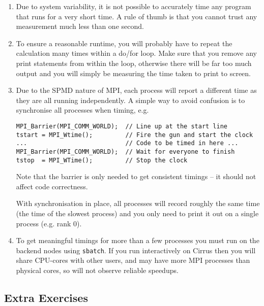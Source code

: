 \documentclass{article}
\begin{document}
\begin{enumerate}

\item Due to system variability, it is not possible to accurately time
  any program that runs for a very short time. A rule of thumb is
  that you cannot trust any measurement much less than one
  second.

\item To ensure a reasonable runtime, you will probably have to repeat
  the calculation many times within a do/for loop. Make sure that you
  remove any print statements from within the loop, otherwise there will
  be far too much output and you will simply be measuring the time taken
  to print to screen.

\item Due to the SPMD nature of MPI, each process will report
  a different time as they are all running independently. A simple way
  to avoid confusion is to synchronise all processes when timing, e.g.
\begin{verbatim}
MPI_Barrier(MPI_COMM_WORLD);  // Line up at the start line
tstart = MPI_Wtime();         // Fire the gun and start the clock
...                           // Code to be timed in here ...
MPI_Barrier(MPI_COMM_WORLD);  // Wait for everyone to finish
tstop  = MPI_WTime();         // Stop the clock
\end{verbatim}

Note that the barrier is only needed to get consistent timings --
it should not affect code correctness.

With synchronisation in place, all processes will record roughly the
same time (the time of the slowest process) and you only need to print
it out on a single process (e.g. rank 0).

\item To get meaningful timings for more than a few processes you must
  run on the backend nodes using \verb+sbatch+. If you run interactively on
  Cirrus then you will share CPU-cores with other users, and may have
  more MPI processes than physical cores, so will not observe reliable
  speedups.

\end{enumerate}

\subsection{Extra Exercises}
\end{document}
